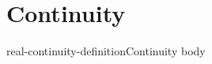 \documentclass[preview]{standalone}
\begin{document}
\genpage

\section{Continuity}

\begin{snippetdefinition}{real-continuity-definition}{Continuity}
    body
\end{snippetdefinition}
\end{document}
